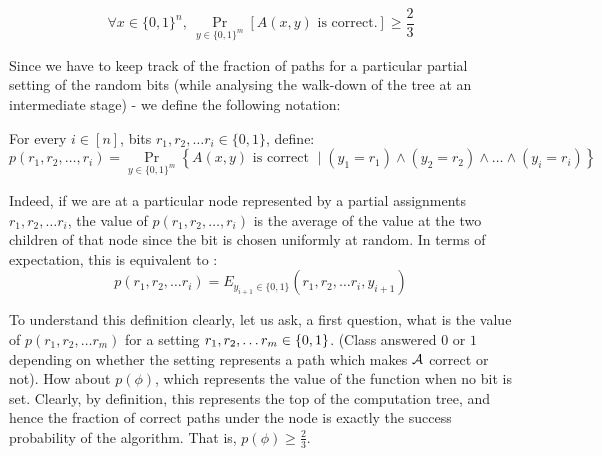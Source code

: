 \vspace{5mm}
\begin{minipage}{0.4\linewidth}
\end{minipage}
\begin{minipage}{0.05\linewidth}
~
\end{minipage}
\begin{minipage}{0.5\linewidth}
$$\forall x \in \{0,1\}^n,~\Pr_{y \in \{0,1\}^m} [A(x,y) \textrm{ is correct.}] \ge \frac{2}{3} $$
\end{minipage}
\vspace{3mm}

Since we have to keep track of the fraction of paths for a particular partial setting of the random bits (while analysing the walk-down of the tree at an intermediate stage) - we define the following notation:

For every $i \in [n]$, bits $r_1, r_2, \ldots r_i \in \{0,1\}$, define:
$$p(r_1, r_2, \ldots, r_i) = \Pr_{y \in \{0,1\}^m} \left\{ A(x,y) \textrm{ is correct } \mid  (y_1 = r_1) \land (y_2 = r_2) \land \ldots \land (y_i = r_i) \right\}$$

Indeed, if we are at a particular node represented by a partial assignments $r_1, r_2, \ldots r_i$, the value of $p(r_1, r_2, \ldots , r_i)$ is the average of the value at the two children of that node since the bit is chosen uniformly at random. In terms of expectation, this is equivalent to :
$$p(r_1, r_2, \ldots r_i) = E_{y_{i+1} \in \{0,1\}} (r_1, r_2, \ldots r_i, y_{i+1})$$

To understand this definition clearly, let us ask, a first question, what is the value of $p(r_1, r_2, \ldots r_m)$ for a setting $r_1, r_2, \ldots r_m \in \{0,1\}$. (Class answered $0$ or $1$ depending on whether the setting represents a path which makes $\cal{A}$ correct or not). How about $p(\phi)$, which represents the value of the function when no bit is set. Clearly, by definition, this represents the top of the computation tree, and hence the fraction of correct paths under the node is exactly the success probability of the algorithm. That is, $p(\phi) \ge \frac{2}{3}$.

